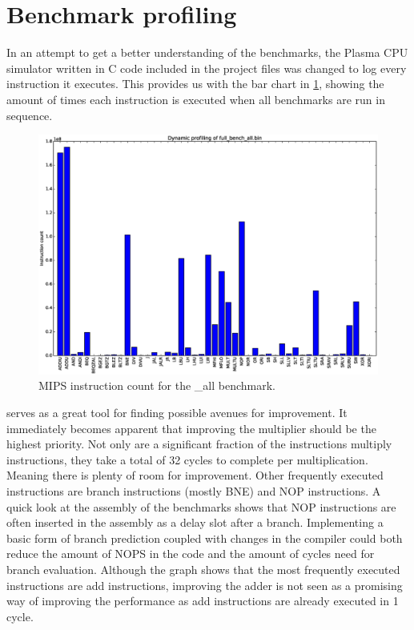 \documentclass[final]{article}
\begin{document}
\section{Benchmark profiling}
\label{sec:benchprof}

In an attempt to get a better understanding of the benchmarks, the Plasma CPU simulator written in C code included in the project files was changed to log every instruction it executes.
This provides us with the bar chart in \cref{fig:instruction-count}, showing the amount of times each instruction is executed when all benchmarks are run in sequence.

\begin{figure}[H]
\centering
\centerline{\includegraphics[width=1.2\textwidth]{resources/bar-chart.eps}}
\caption{MIPS instruction count for the \_all benchmark.}
\label{fig:instruction-count}
\end{figure}

 serves as a great tool for finding possible avenues for improvement.
It immediately becomes apparent that improving the multiplier should be the highest priority.
Not only are a significant fraction of the instructions multiply instructions, they take a total of 32 cycles to complete per multiplication.
Meaning there is plenty of room for improvement.
Other frequently executed instructions are branch instructions (mostly BNE) and NOP instructions.
A quick look at the assembly of the benchmarks shows that NOP instructions are often inserted in the assembly as a delay slot after a branch.
Implementing a basic form of branch prediction coupled with changes in the compiler could both reduce the amount of NOPS in the code and the amount of cycles need for branch evaluation.
Although the graph shows that the most frequently executed instructions are add instructions, improving the adder is not seen as a promising way of improving the performance as add instructions are already executed in 1 cycle.
\end{document}
